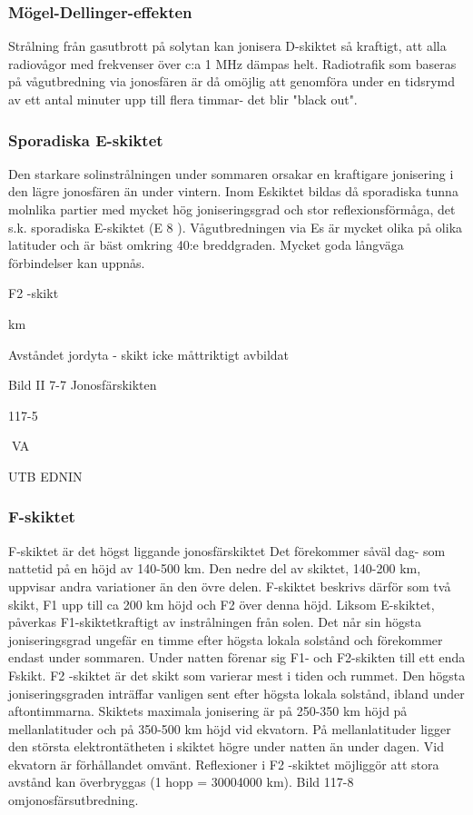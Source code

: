 \subsubsection{Mögel-Dellinger-effekten}
Strålning från gasutbrott på solytan kan jonisera D-skiktet så kraftigt, att alla radiovågor
med frekvenser över c:a 1 MHz dämpas helt.
Radiotrafik som baseras på vågutbredning
via jonosfären är då omöjlig att genomföra
under en tidsrymd av ett antal minuter upp till
flera timmar- det blir "black out".

\subsubsection{Sporadiska E-skiktet}
Den starkare solinstrålningen under sommaren orsakar en kraftigare jonisering i den
lägre jonosfären än under vintern. Inom Eskiktet bildas då sporadiska tunna molnlika
partier med mycket hög joniseringsgrad och
stor reflexionsförmåga, det s.k. sporadiska
E-skiktet (E 8 ). Vågutbredningen via Es är
mycket olika på olika latituder och är bäst
omkring 40:e breddgraden. Mycket goda
långväga förbindelser kan uppnås.

F2 -skikt

km

Avståndet jordyta - skikt icke måttriktigt avbildat

Bild II 7-7 Jonosfärskikten

117-5

VA

UTB EDNIN

\subsubsection{F-skiktet}
F-skiktet är det högst liggande jonosfärskiktet
Det förekommer såväl dag- som nattetid på
en höjd av 140-500 km. Den nedre del av
skiktet, 140-200 km, uppvisar andra variationer än den övre delen. F-skiktet beskrivs
därför som två skikt, F1 upp till ca 200 km
höjd och F2 över denna höjd.
Liksom E-skiktet, påverkas F1-skiktetkraftigt av instrålningen från solen. Det når sin
högsta joniseringsgrad ungefär en timme
efter högsta lokala solstånd och förekommer
endast under sommaren. Under natten förenar sig F1- och F2-skikten till ett enda Fskikt.
F2 -skiktet är det skikt som varierar mest i
tiden och rummet. Den högsta joniseringsgraden inträffar vanligen sent efter högsta
lokala solstånd, ibland under aftontimmarna.
Skiktets maximala jonisering är på 250-350
km höjd på mellanlatituder och på 350-500
km höjd vid ekvatorn. På mellanlatituder
ligger den största elektrontätheten i skiktet
högre under natten än under dagen. Vid
ekvatorn är förhållandet omvänt.
Reflexioner i F2 -skiktet möjliggör att stora
avstånd kan överbryggas (1 hopp = 30004000 km). Bild 117-8 omjonosfärsutbredning.

